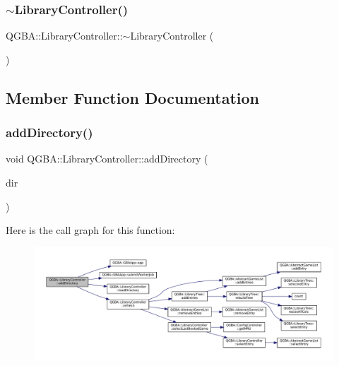\subsubsection{\texorpdfstring{$\sim$\+Library\+Controller()}{~LibraryController()}}
{\footnotesize\ttfamily Q\+G\+B\+A\+::\+Library\+Controller\+::$\sim$\+Library\+Controller (\begin{DoxyParamCaption}{ }\end{DoxyParamCaption})}



\subsection{Member Function Documentation}
\mbox{\label{class_q_g_b_a_1_1_library_controller_aa8c7e9e762d7740da86d3c6795e01742}} 
\subsubsection{\texorpdfstring{add\+Directory()}{addDirectory()}}
{\footnotesize\ttfamily void Q\+G\+B\+A\+::\+Library\+Controller\+::add\+Directory (\begin{DoxyParamCaption}\item[{const Q\+String \&}]{dir }\end{DoxyParamCaption})}

Here is the call graph for this function\+:
\nopagebreak
\begin{figure}[H]
\begin{center}
\leavevmode
\includegraphics[width=350pt]{class_q_g_b_a_1_1_library_controller_aa8c7e9e762d7740da86d3c6795e01742_cgraph}
\end{center}
\end{figure}
\mbox{\label{class_q_g_b_a_1_1_library_controller_a71ee6910dd69a573702798a708f7d378}} 
